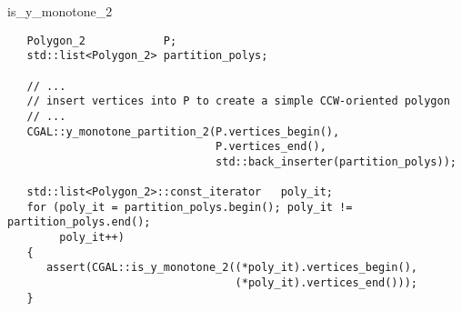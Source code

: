 \begin{ccRefFunction}{is_y_monotone_2}
\begin{verbatim}
   Polygon_2            P;
   std::list<Polygon_2> partition_polys;

   // ...
   // insert vertices into P to create a simple CCW-oriented polygon
   // ...
   CGAL::y_monotone_partition_2(P.vertices_begin(),
                                P.vertices_end(),
                                std::back_inserter(partition_polys));

   std::list<Polygon_2>::const_iterator   poly_it;
   for (poly_it = partition_polys.begin(); poly_it != partition_polys.end();
        poly_it++)
   {
      assert(CGAL::is_y_monotone_2((*poly_it).vertices_begin(), 
                                   (*poly_it).vertices_end()));
   }
\end{verbatim}



\end{ccRefFunction}
